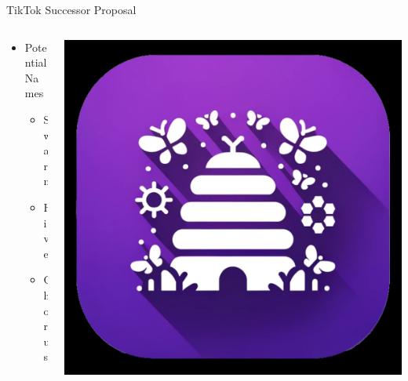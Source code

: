 \documentclass[aspectratio=169]{beamer}
\begin{document}
\begin{frame}{TikTok Successor Proposal}

\begin{columns}[T]
    \begin{column}[T]{0.5\textwidth}
        \begin{itemize}
            \item Potential Names
            \begin{itemize}
                \item Swarm
                \item Hive
                \item Chorus
            \end{itemize}
        \end{itemize}
    \end{column}
    
    \begin{column}{0.5\textwidth}
        \includegraphics[height=0.8\textheight]{imgs/app_icons/2.png}
    \end{column}
\end{columns}
\end{frame}
\end{document}
